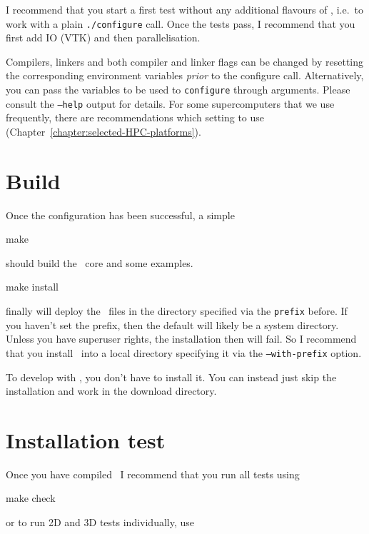 \begin{remark}
 I recommend that you start a first test without any additional flavours of
 \Peano, i.e.~to work with a plain \texttt{./configure} call. Once the tests
 pass, I recommend that you first add IO (VTK) and then parallelisation.
\end{remark}


\noindent
Compilers, linkers and both compiler and linker flags can be changed by
resetting the corresponding environment variables \emph{prior} to the configure
call.
Alternatively, you can pass the variables to be used to \texttt{configure}
through arguments. 
Please consult the \texttt{--help} output for details.
For some supercomputers that we use frequently, there are recommendations which
setting to use (Chapter~\ref{chapter:selected-HPC-platforms}).



\section{Build}

Once the configuration has been successful, a simple 
\begin{code}
make
\end{code}
should build the \Peano\ core and some examples.


\begin{code}
make install
\end{code}
finally will deploy the \Peano\ files in the directory specified via the
\texttt{prefix} before.
If you haven't set the prefix, then the default will likely be a system
directory.
Unless you have superuser rights, the installation then will fail.
So I recommend that you install \Peano\ into a local directory specifying it via
the \texttt{--with-prefix} option.


\begin{remark}
 To develop with \Peano, you don't have to install it. You can instead just skip
 the installation and work in the download directory.
\end{remark}




\section{Installation test}

Once you have compiled \Peano\, I recommend that you run all tests using

\begin{code}
  make check
\end{code}
or to run 2D and 3D tests individually, use

